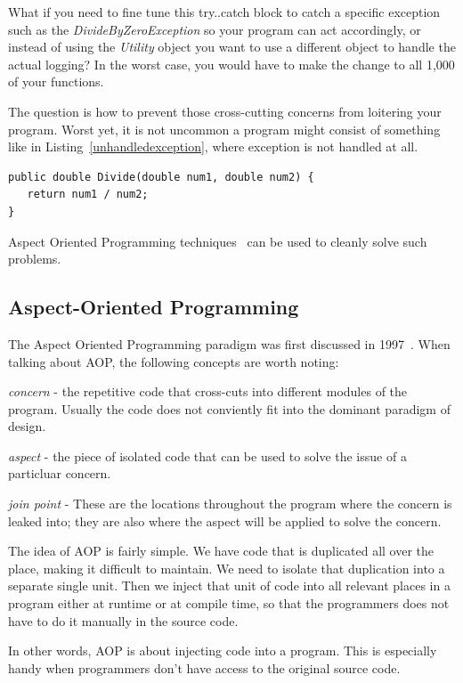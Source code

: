 What if you need to fine tune this try..catch block to catch a specific exception such as the {\em DivideByZeroException} so your program can act accordingly, or instead of using the {\em Utility} object you want to use a different object to handle the actual logging? In the worst case, you would have to make the change to all 1,000 of your functions.

The question is how to prevent those cross-cutting concerns from loitering your program. Worst yet, it is not uncommon a program might consist of something like in Listing~\ref{unhandledexception}, where exception is not handled at all.

\begin{lstlisting}[caption={Unhandle exception}, label=unhandledexception]
public double Divide(double num1, double num2) {
   return num1 / num2;
}
\end{lstlisting}

Aspect Oriented Programming techniques~\cite{aop} can be used to cleanly solve such problems.

\subsection{Aspect-Oriented Programming}
The Aspect Oriented Programming paradigm was first discussed in 1997~\cite{aop}. When talking about AOP, the following concepts are worth noting:

{\em concern} - the repetitive code that cross-cuts into different modules of the program. Usually the code does not conviently fit into the dominant paradigm of design.

{\em aspect} - the piece of isolated code that can be used to solve the issue of a particluar concern.

{\em join point} - These are the locations throughout the program where the concern is leaked into; they are also where the aspect will be applied to solve the concern.

The idea of AOP is fairly simple. We have code that is duplicated all over the place, making it difficult to maintain. We need to isolate that duplication into a separate single unit. Then we inject that unit of code into all relevant places in a program either at runtime or at compile time, so that the programmers does not have to do it manually in the source code.

In other words, AOP is about injecting code into a program. This is especially handy when programmers don't have access to the original source code.

